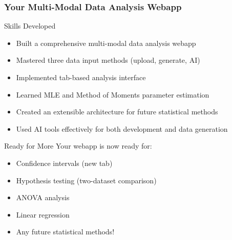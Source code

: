 \documentclass[aspectratio=169]{beamer}
\begin{document}
\begin{frame}
\frametitle{Your Multi-Modal Data Analysis Webapp}
\begin{alertblock}{Skills Developed}
\begin{itemize}
\item Built a comprehensive multi-modal data analysis webapp
\item Mastered three data input methods (upload, generate, AI)
\item Implemented tab-based analysis interface
\item Learned MLE and Method of Moments parameter estimation
\item Created an extensible architecture for future statistical methods
\item Used AI tools effectively for both development and data generation
\end{itemize}
\end{alertblock}

\begin{exampleblock}{Ready for More}
Your webapp is now ready for:
\begin{itemize}
\item Confidence intervals (new tab)
\item Hypothesis testing (two-dataset comparison)
\item ANOVA analysis
\item Linear regression
\item Any future statistical methods!
\end{itemize}
\end{exampleblock}
\end{frame}
\end{document}
